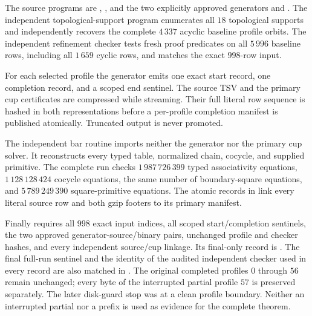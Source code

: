 \begin{remark}
\label{C:seventeen-four-verification}
The source programs are
,
, and the two explicitly approved
generators
 and
.
The independent topological-support program
enumerates all $18$ topological supports and independently
recovers the complete $4\,337$ acyclic baseline profile orbits.
The independent refinement checker tests fresh proof predicates
on all $5\,996$ baseline rows, including all $1\,659$ cyclic rows,
and matches the exact $998$-row input.

For each selected profile the generator emits one exact start
record, one completion record, and a scoped end sentinel.
The source TSV and the primary cup certificates are compressed
while streaming.  Their full literal row sequence is hashed in
both representations before a per-profile completion manifest is
published atomically.  Truncated output is never promoted.

The independent bar routine
 imports neither
the generator nor the primary cup solver.  It reconstructs every
typed table, normalized chain, cocycle, and supplied primitive.
The complete run checks $1\,987\,726\,399$ typed associativity
equations, $1\,128\,128\,424$ cocycle equations, the same number of boundary-square
equations, and $5\,789\,249\,390$ square-primitive equations.
The atomic records in  link every
literal source row and both gzip footers to its primary manifest.

Finally  requires all
$998$ exact input indices, all scoped start/completion sentinels,
the two approved generator-source/binary pairs, unchanged profile
and checker hashes, and every independent source/cup linkage.
Its final-only record is
.
The final full-run sentinel and the identity of the audited independent
checker used in every record are also matched in
.
The original completed profiles $0$ through $56$ remain unchanged;
every byte of the interrupted partial profile $57$ is preserved
separately.  The later disk-guard stop was at a clean profile
boundary.  Neither an interrupted partial nor a prefix is used as
evidence for the complete theorem.

\end{remark}
